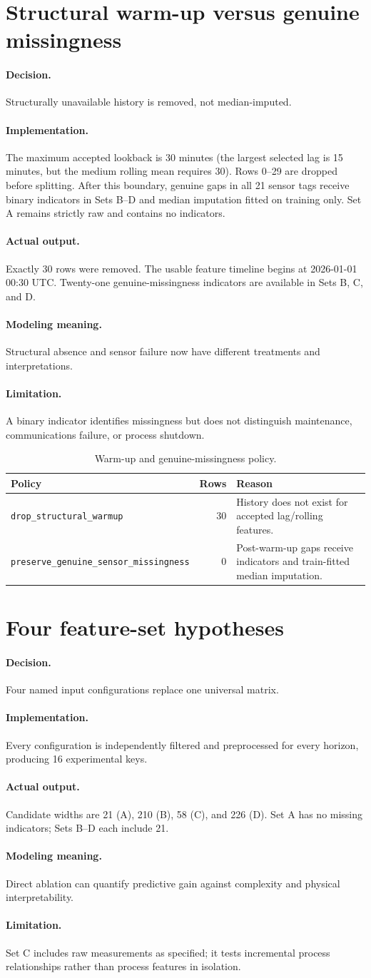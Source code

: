 \documentclass[10pt,a4paper]{article}
\newcommand{\decision}{\paragraph{Decision.}}
\newcommand{\implementation}{\paragraph{Implementation.}}
\newcommand{\actual}{\paragraph{Actual output.}}
\newcommand{\modelmeaning}{\paragraph{Modeling meaning.}}
\newcommand{\limitation}{\paragraph{Limitation.}}
\begin{document}
\section{Structural warm-up versus genuine missingness}
\decision Structurally unavailable history is removed, not median-imputed.
\implementation The maximum accepted lookback is 30 minutes (the largest selected lag is 15 minutes, but the medium rolling mean requires 30). Rows 0--29 are dropped before splitting. After this boundary, genuine gaps in all 21 sensor tags receive binary indicators in Sets B--D and median imputation fitted on training only. Set A remains strictly raw and contains no indicators.
\actual Exactly 30 rows were removed. The usable feature timeline begins at 2026-01-01 00:30 UTC. Twenty-one genuine-missingness indicators are available in Sets B, C, and D.
\modelmeaning Structural absence and sensor failure now have different treatments and interpretations.
\limitation A binary indicator identifies missingness but does not distinguish maintenance, communications failure, or process shutdown.


\begin{table}[H]
\centering
\small
\begin{tabular}{p{}r p{}}
\toprule
Policy & Rows & Reason \\
\midrule
\nolinkurl{drop_structural_warmup} & 30 & History does not exist for accepted lag/rolling features. \\
\nolinkurl{preserve_genuine_sensor_missingness} & 0 & Post-warm-up gaps receive indicators and train-fitted median imputation. \\
\bottomrule
\end{tabular}
\caption{Warm-up and genuine-missingness policy.}
\end{table}


\section{Four feature-set hypotheses}
\decision Four named input configurations replace one universal matrix.
\implementation Every configuration is independently filtered and preprocessed for every horizon, producing 16 experimental keys.
\actual Candidate widths are 21 (A), 210 (B), 58 (C), and 226 (D). Set A has no missing indicators; Sets B--D each include 21.
\modelmeaning Direct ablation can quantify predictive gain against complexity and physical interpretability.
\limitation Set C includes raw measurements as specified; it tests incremental process relationships rather than process features in isolation.
\end{document}

